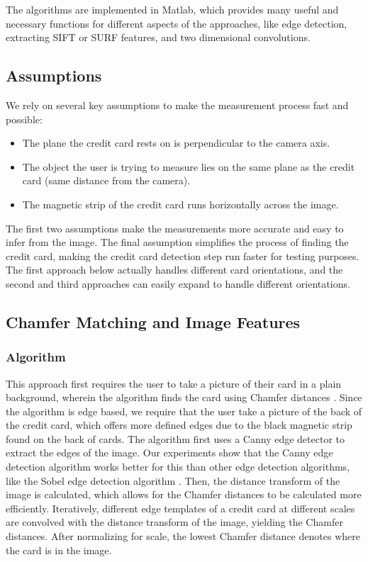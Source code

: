 \documentclass[10pt,twocolumn,letterpaper]{article}
\begin{document}
	The algorithms are implemented in Matlab, which provides many useful and necessary functions for different aspects of the approaches, like edge detection, extracting SIFT or SURF features, and two dimensional convolutions.  

\subsection{Assumptions}

	We rely on several key assumptions to make the measurement process fast and possible:

\begin{itemize}
\item The plane the credit card rests on is perpendicular to the camera axis.
\item The object the user is trying to measure lies on the same plane as the credit card (same distance from the camera). 
\item The magnetic strip of the credit card runs horizontally across the image.
\end{itemize}

The first two assumptions make the measurements more accurate and easy to infer from the image. The final assumption simplifies the process of finding the credit card, making the credit card detection step run faster for testing purposes. The first approach below actually handles different card orientations, and the second and third approaches can easily expand to handle different orientations. 

\subsection{Chamfer Matching and Image Features}
\subsubsection{Algorithm}

This approach first requires the user to take a picture of their card in a plain background, wherein the algorithm finds the card using Chamfer distances \cite{chamfer}. Since the algorithm is edge based, we require that the user take a picture of the back of the credit card, which offers more defined edges due to the black magnetic strip found on the back of cards. The algorithm first uses a Canny edge detector to extract the edges of the image. Our experiments show that the Canny edge detection algorithm works better for this than other edge detection algorithms, like the Sobel edge detection algorithm \cite{canny}. Then, the distance transform of the image is calculated, which allows for the Chamfer distances to be calculated more efficiently. Iteratively, different edge templates of a credit card at different scales are convolved with the distance transform of the image, yielding the Chamfer distances. After normalizing for scale, the lowest Chamfer distance denotes where the card is in the image.
\end{document}
